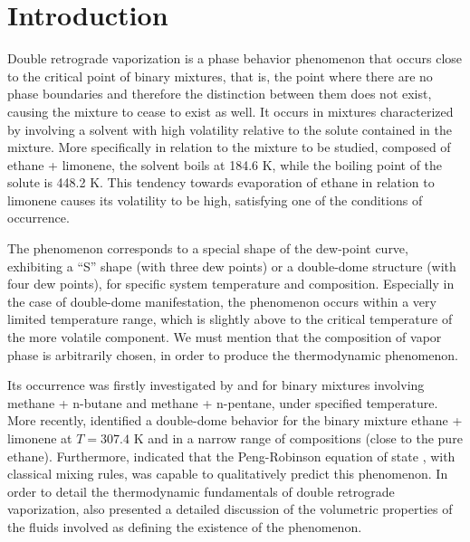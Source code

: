 \documentclass[journal=iecred,manuscript=article]{achemso}
\theoremstyle{definition}
\theoremstyle{remark}
\begin{document}
\section{Introduction}

Double retrograde vaporization is a phase behavior phenomenon that occurs close to the critical point of binary mixtures, that is, the point where there are no phase boundaries and therefore the distinction between them does not exist, causing the mixture to cease to exist as well. It occurs in mixtures characterized by involving a solvent with high volatility relative to the solute contained in the mixture. More specifically in relation to the mixture to be studied, composed of ethane + limonene, the solvent boils at 184.6 K, while the boiling point of the solute is 448.2 K. This tendency towards evaporation of ethane in relation to limonene causes its volatility to be high, satisfying one of the conditions of occurrence.

The phenomenon corresponds to a special shape of the dew-point curve, exhibiting a \enquote{S} shape (with three dew points) or a double-dome structure (with four dew points), for specific system temperature and composition. Especially in the case of double-dome manifestation, the phenomenon occurs within a very limited temperature range, which is slightly above to the critical temperature of the more volatile component. We must mention that the composition of vapor phase is arbitrarily chosen, in order to produce the thermodynamic phenomenon.

Its occurrence was firstly investigated by \citet{chen_1} and \citet{chen_2} for binary mixtures involving methane + n-butane and methane + n-pentane, under specified temperature. More recently, \citet{raeissi_1} identified a double-dome behavior for the binary mixture ethane + limonene at $T = 307.4$ K and in a narrow range of compositions (close to the pure ethane). Furthermore, \citet{raeissi_2} indicated that the Peng-Robinson equation of state \citep{peng_robinson}, with classical mixing rules, was capable to qualitatively predict this phenomenon. In order to detail the thermodynamic fundamentals of double retrograde vaporization, \citet{raeissi2004thermodynamic} also presented a detailed discussion of the volumetric properties of the fluids involved as defining the existence of the phenomenon.
\end{document}
